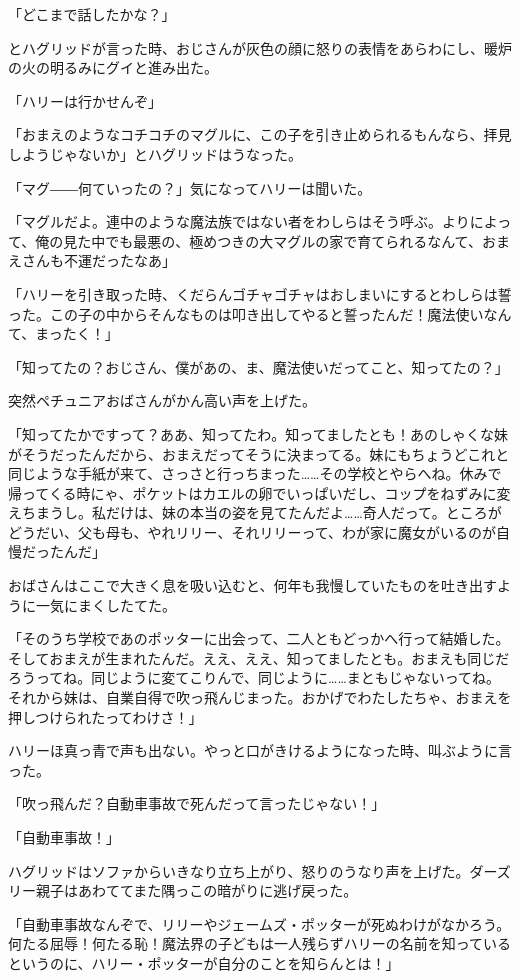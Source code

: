 \documentclass[10pt,a4paper]{article}
\begin{document}
\begin{CJK}{UTF8}{min}
「どこまで話したかな？」

とハグリッドが言った時、おじさんが灰色の顔に怒りの表情をあらわにし、暖炉の火の明るみにグイと進み出た。

「ハリーは行かせんぞ」

「おまえのようなコチコチのマグルに、この子を引き止められるもんなら、拝見しようじゃないか」とハグリッドはうなった。

「マグ――何ていったの？」気になってハリーは聞いた。

「マグルだよ。連中のような魔法族ではない者をわしらはそう呼ぶ。よりによって、俺の見た中でも最悪の、極めつきの大マグルの家で育てられるなんて、おまえさんも不運だったなあ」

「ハリーを引き取った時、くだらんゴチャゴチャはおしまいにするとわしらは誓った。この子の中からそんなものは叩き出してやると誓ったんだ！魔法使いなんて、まったく！」

「知ってたの？おじさん、僕があの、ま、魔法使いだってこと、知ってたの？」

突然ペチュニアおばさんがかん高い声を上げた。

「知ってたかですって？ああ、知ってたわ。知ってましたとも！あのしゃくな妹がそうだったんだから、おまえだってそうに決まってる。妹にもちょうどこれと同じような手紙が来て、さっさと行っちまった……その学校とやらへね。休みで帰ってくる時にゃ、ポケットはカエルの卵でいっぱいだし、コップをねずみに変えちまうし。私だけは、妹の本当の姿を見てたんだよ……奇人だって。ところがどうだい、父も母も、やれリリー、それリリーって、わが家に魔女がいるのが自慢だったんだ」

おばさんはここで大きく息を吸い込むと、何年も我慢していたものを吐き出すように一気にまくしたてた。

「そのうち学校であのポッターに出会って、二人ともどっかへ行って結婚した。そしておまえが生まれたんだ。ええ、ええ、知ってましたとも。おまえも同じだろうってね。同じように変てこりんで、同じように……まともじゃないってね。それから妹は、自業自得で吹っ飛んじまった。おかげでわたしたちゃ、おまえを押しつけられたってわけさ！」

ハリーほ真っ青で声も出ない。やっと口がきけるようになった時、叫ぶように言った。

「吹っ飛んだ？自動車事故で死んだって言ったじゃない！」

「自動車事故！」

ハグリッドはソファからいきなり立ち上がり、怒りのうなり声を上げた。ダーズリー親子はあわててまた隅っこの暗がりに逃げ戻った。

「自動車事故なんぞで、リリーやジェームズ・ポッターが死ぬわけがなかろう。何たる屈辱！何たる恥！魔法界の子どもは一人残らずハリーの名前を知っているというのに、ハリー・ポッターが自分のことを知らんとは！」


\end{CJK}
\end{document}
